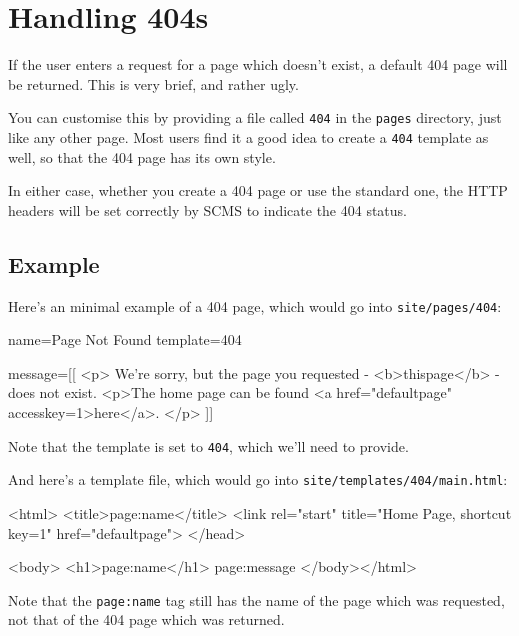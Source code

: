 %
%
%
%
%
%
% 
%
% 
% 
%

\chapter{Handling 404s}
\label{404chap}
If the user enters a request for a page which doesn't exist, a default 404 page will be returned. This is 
very brief, and rather ugly.

You can customise this by providing a file called \texttt{404} in the
\texttt{pages} directory, just like any other page. Most users find it a good
idea to create a \texttt{404} template as well, so that the 404 page has its
own style.

In either case, whether you create a 404 page or use the standard one, the HTTP headers will be set correctly
by SCMS to indicate the 404 status.

\section{Example}
Here's an minimal example of a 404 page, which would go into \texttt{site/pages/404}:
\begin{MyVerbatim}
name=Page Not Found
template=404

message=[[
<p>
We're sorry, but the page you requested -
<b>{{thispage}}</b> - does not exist.
<p>The home page can be found <a href="{{defaultpage}}"
    accesskey=1>here</a>.
</p>
]]
\end{MyVerbatim}
Note that the template is set to \texttt{404}, which we'll need to provide.

\clearpage
\noindent And here's a template file, which would go into \texttt{site/templates/404/main.html}:
\begin{MyVerbatim}
<html>
<title>{{page:name}}</title>
<link rel="start" title="Home Page, shortcut key=1"
    href="{{defaultpage}}">
</head>

<body>
<h1>{{page:name}}</h1>
{{page:message}}
</body></html>
\end{MyVerbatim}

Note that the \texttt{page:name} tag still has the name of the page which was requested, not that of the 404 page
which was returned.
